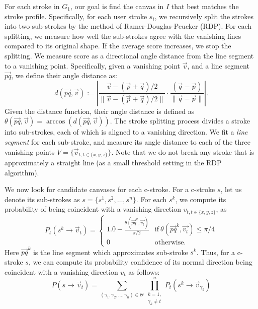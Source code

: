 %
For each stroke in $G_1$, our goal is find the canvas in $I$ that best matches the stroke profile. Specifically, for each user stroke $s_i$, we recursively split the strokes into two sub-strokes by the method of Ramer-Douglas-Peucker (RDP). For each splitting, we measure how well the sub-strokes agree with the vanishing lines compared to its original shape. If the average score increases, we stop the splitting. We measure score as a directional angle distance from the line segment to a vanishing point. Specifically, given a vanishing point $\vec{v}$, and a line segment $\vec{pq}$, we define their angle distance as:
%
\begin{equation}
d(\vec{pq}, \vec{v}) := {\left| \frac{\vec{v} - (\vec{p}+\vec{q})/2}{\| \vec{v} - (\vec{p}+\vec{q})/2 \|} \cdot  {\frac{(\vec{q}-\vec{p})}{\|\vec{q}-\vec{p}\|}}\right|}.
\end{equation}
%
Given the distance function, their angle distance is defined as $\theta(\vec{pq}, \vec{v}) = \arccos(d(\vec{pq}, \vec{v}))$. The stroke splitting process divides a stroke into sub-strokes, each of which is aligned to a vanishing direction. We fit a \emph{line segment} for each sub-stroke, and measure its angle distance to each of the three vanishing points $V=\{\vec{v}_{t, t \in \{x,y,z\}}\}$. Note that we do not break any stroke that is approximately a straight line (as a small threshold setting in the RDP algorithm).



%
We now look for candidate canvases for each c-stroke. For a c-stroke $s$, let us denote its sub-strokes as $s = \{{s}^1,{s}^2,\dots, s^n\}$. For each ${s}^k$, we compute its probability of being coincident with a vanishing direction $v_{t,t \in \{x,y,z\}}$, as
\begin{equation}
P_t({s}^k \rightarrow \vec{v}_t) = \left\{ \begin{array}{ll}
1.0 - \frac{\theta(\vec{pq}^k, \vec{v_t})}{\pi/2} & \text{if} \ \theta(\vec{pq}^k, \vec{v_t}) \leq \pi/4\\
0 & \text{otherwise.}
\end{array} \right.
\end{equation}
Here ${\vec{pq}}^k$ is the line segment which approximates sub-stroke $s^k$. Thus, for a c-stroke $s$, we can compute its probability confidence of its normal direction being coincident with a vanishing direction $v_t$ as follows:
\begin{equation}
P({s} \rightarrow \vec{v}_t) = \sum_{(\gamma_1,\gamma_2,...,\gamma_n) \in \Theta}\prod_{\substack{k = 1, \\ \gamma_k \neq t}}^nP_t({s}^k \rightarrow \vec{v}_{\gamma_k})
\end{equation}

